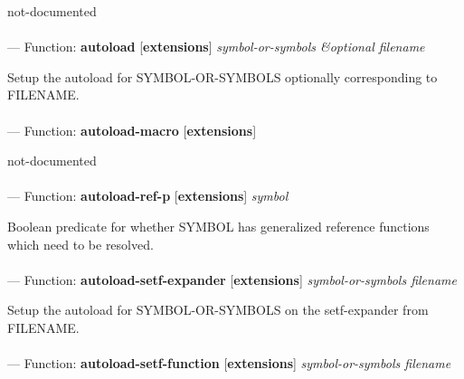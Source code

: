 \begin{adjustwidth}{5em}{5em}
not-documented
\end{adjustwidth}

\paragraph{}
\label{EXTENSIONS:AUTOLOAD}
--- Function: \textbf{autoload} [\textbf{extensions}] \textit{symbol-or-symbols \&optional filename}

\begin{adjustwidth}{5em}{5em}
Setup the autoload for SYMBOL-OR-SYMBOLS optionally corresponding to FILENAME.
\end{adjustwidth}

\paragraph{}
\label{EXTENSIONS:AUTOLOAD-MACRO}
--- Function: \textbf{autoload-macro} [\textbf{extensions}] \textit{}

\begin{adjustwidth}{5em}{5em}
not-documented
\end{adjustwidth}

\paragraph{}
\label{EXTENSIONS:AUTOLOAD-REF-P}
--- Function: \textbf{autoload-ref-p} [\textbf{extensions}] \textit{symbol}

\begin{adjustwidth}{5em}{5em}
Boolean predicate for whether SYMBOL has generalized reference functions which need to be resolved.
\end{adjustwidth}

\paragraph{}
\label{EXTENSIONS:AUTOLOAD-SETF-EXPANDER}
--- Function: \textbf{autoload-setf-expander} [\textbf{extensions}] \textit{symbol-or-symbols filename}

\begin{adjustwidth}{5em}{5em}
Setup the autoload for SYMBOL-OR-SYMBOLS on the setf-expander from FILENAME.
\end{adjustwidth}

\paragraph{}
\label{EXTENSIONS:AUTOLOAD-SETF-FUNCTION}
--- Function: \textbf{autoload-setf-function} [\textbf{extensions}] \textit{symbol-or-symbols filename}

